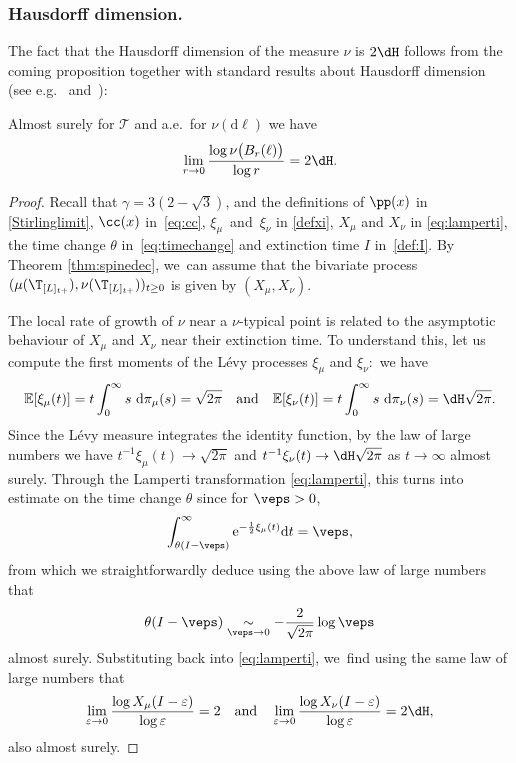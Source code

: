 \subsubsection*{Hausdorff dimension.}

The fact that the Hausdorff dimension of the measure $\nu$ is $2 \dH$ follows from the coming proposition together with standard results about Hausdorff dimension (see e.g.~\cite[Lem.\,4.1]{lyons1995ergodic} and~\cite[\S 14]{billingsley1965}):

\begin{prop}\label{prop:continuous Hausdorff} Almost surely for $\mathcal{T}$ and a.e.\ for $\nu(\mathrm{d}\ell)$ we have
\[
\lim_{r \to 0} \frac{\log \nu \big(B_r(\ell)\big) }{\log r} = 2 \dH.
\]
\end{prop}

\begin{proof}
Recall that $\gamma=3(2-\sqrt{3})$, and the definitions of $\pp(x)$ in \eqref{Stirlinglimit}, $\cc(x)$ in~\eqref{eq:cc}, $\xi_\mu$~and~$\xi_\nu$ in \eqref{defxi}, $X_\mu$ and $X_\nu$ in \eqref{eq:lamperti}, the time change $\theta$ in~\eqref{eq:timechange} and extinction time $I$ in~\eqref{def:I}. By Theorem \ref{thm:spinedec}, we~can assume that the bivariate process $(\mu(\T_{[L]_{t+}}),\nu(\T_{[L]_{t+}}))_{t\geq 0}$ is given by $(X_\mu,X_\nu)$.

The local rate of growth of $\nu$ near a $\nu$-typical point is related to the asymptotic behaviour of $X_\mu$ and $X_\nu$ near their extinction time. To understand this, let us compute the first moments of the Lévy processes $\xi_\mu$ and $\xi_\nu:$ we have
\[
\mathbb{E}[\xi_\mu(t)] = t \int_0^{\infty} s\ \mathrm{d}\pi_\mu(s) = \sqrt{2 \pi} \quad \text{and}\quad \mathbb{E}[\xi_\nu(t)] = t \int_0^{\infty} s\ \mathrm{d}\pi_\nu(s) = \dH \sqrt{2\pi}.
\]
Since the Lévy measure integrates the identity function, by the law of large numbers we have $t^{-1}\xi_\mu (t) \to \sqrt{2 \pi}$ and $t^{-1}\xi_\nu (t) \to \dH \sqrt{2\pi}$ as $t \to \infty$ almost surely. Through the Lamperti transformation \eqref{eq:lamperti}, this turns into estimate on the time change $\theta$ since for $\veps>0$,
\[
\int_{\theta(I-\veps)}^{\infty} \mathrm{e}^{-\frac12 \xi_\mu(t)}\mathrm dt=\veps,
\]
from which we straightforwardly deduce using the above law of large numbers that
\[
\theta(I-\veps)\underset{\veps\to 0}\sim-\frac2{\sqrt{2\pi}}\log \veps
\]
almost surely. Substituting back into \eqref{eq:lamperti}, we~find using the same law of large numbers that
\[
\lim_{ \varepsilon \to 0}\frac{\log X_\mu(I - \varepsilon)}{\log \varepsilon} =2\quad \text{and} \quad \lim_{ \varepsilon \to 0}\frac{\log X_\nu(I - \varepsilon)}{\log \varepsilon} = 2\dH,
\]
also almost surely.


\end{proof}
